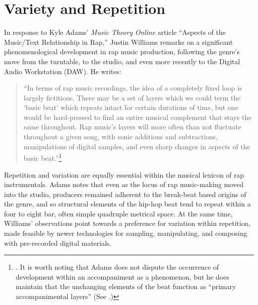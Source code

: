 \onehalfspacing 
\label{chapter2}
\section{Variety and Repetition}
In response to Kyle Adams' \textit{Music Theory Online} article ``Aspects of the Music/Text
Relationship in Rap,'' Justin Williams remarks on a significant phenomenological development
in rap music production, following the genre's move from the turntable, to the studio, and 
even more recently to the Digital Audio Workstation (DAW). He writes:
    \begin{quote}
        ``In terms of rap music recordings, the idea of a completely fixed loop is 
        largely fictitious. There may be a set of layers which we could term the `basic beat'
        which repeats intact for certain durations of time, but one would be hard-pressed to
        find an entire musical complement that stays the same throughout. Rap music’s layers
        will more often than not fluctuate throughout a given song, with sonic additions and
        subtractions, manipulations of digital samples, and even sharp changes in aspects of
        the basic beat.''\footnote{
            \cite{justinawilliamsBeatsFlowsResponse2009}. It is worth noting that Adams does 
            not dispute the occurrence of development within an accompaniment as a phenomenon,
            but he does maintain that the unchanging elements of the beat function as ``primary
            accompanimental layers'' (See \cite{kyleadamsPeopleInstinctiveAssumptions2009}.)}
    \end{quote}
Repetition and variation are equally essential within the musical lexicon of rap instrumentals.
Adams notes that even as the locus of rap music-making moved into the studio, producers remained
adherent to the break-beat based origins of the genre, and so structural elements of the hip-hop
beat tend to repeat within a four to eight bar, often simple quadruple metrical space. At the same
time, Williams' observations point towards a preference for variation within repetition, made 
feasible by newer technologies for sampling, manipulating, and composing with pre-recorded digital
materials.

